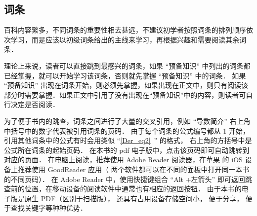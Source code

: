 \subsection{词条}
百科内容繁多，不同词条的重要性相去甚远，不建议初学者按照词条的排列顺序依次学习，而是应该以初级词条给出的主线来学习，再根据兴趣和需要阅读其余词条．

理论上来说，读者可以直接跳到最感兴的词条，如果 “预备知识” 中列出的词条都已经掌握，就可以开始学习该词条，否则就先掌握 “预备知识” 中的词条． 如果 “预备知识” 出现在词条开始，则必须先掌握，如果出现在正文中，则只有阅读该部分时需要掌握．如果正文中引用了没有出现在“预备知识”中的内容，则读者可自行决定是否阅读．

为了便于书内的跳查，词条之间进行了大量的交叉引用，例如 “导数简介” 右上角中括号中的数字代表被引用词条的页码． 由于每个词条的公式编号都从 1 开始， 引用其他词条中的公式有时会用类似 “\autoref{Der_eq2}~” 的格式， 右上角的方括号中是公式所在词条的起始页码． 在本书的 pdf 电子版中，点击该页码即可自动跳转到对应的页面． 在电脑上阅读，推荐使用 Adobe Reader 阅读器，在苹果\textsuperscript{\textregistered} 的 iOS 设备上推荐使用 GoodReader 应用（ 两个软件都可以在不同的面板中打开同一本书的不同页码）． 在 Adobe Reader 中，使用快捷键组合 “Alt +左箭头” 即可返回跳查前的位置，在移动设备的阅读软件中通常也有相应的返回按钮． 由于本书的电子版是原生 PDF（区别于扫描版）， 还具有占用设备存储空间小， 便于分享， 便于查找关键字等种种优势．